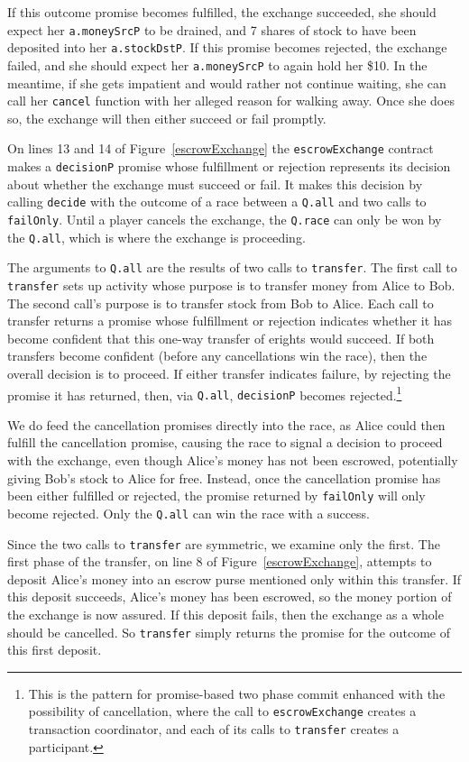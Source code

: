 \documentclass{llncs}
\begin{document}
If this outcome promise becomes fulfilled, the exchange succeeded,  she should expect her {\tt a.moneySrcP} to be drained, and 7 shares of stock to have been deposited into her {\tt a.stockDstP}. If this promise becomes rejected, the exchange failed, and she should expect her {\tt a.moneySrcP} to again hold her \$10. In the meantime, if she gets impatient and would rather not continue waiting, she can call her {\tt cancel} function with her alleged reason for walking away. Once she does so, the exchange will then either succeed or fail promptly.

On lines 13 and 14 of Figure~\ref{escrowExchange} the {\tt escrowExchange} contract makes a {\tt decisionP} promise whose fulfillment or rejection represents its decision about whether the exchange must succeed or fail. It makes this decision by calling {\tt decide} with the outcome of a race between a {\tt Q.all} and two calls to {\tt failOnly}. Until a player cancels the exchange, the {\tt Q.race} can only be won by the {\tt Q.all}, which is where the exchange is proceeding.

The arguments to {\tt Q.all} are the results of two calls to {\tt transfer}. The first call to {\tt transfer} sets up activity whose purpose is to transfer money from Alice to Bob. The second call's purpose is to transfer stock from Bob to Alice. Each call to transfer returns a promise whose fulfillment or rejection indicates whether it has become confident that this one-way transfer of erights would succeed. If both transfers become confident (before any cancellations win the race), then the overall decision is to proceed. If either transfer indicates failure, by rejecting the promise it has returned, then, via {\tt Q.all}, {\tt decisionP} becomes rejected.\footnote{
%
This is the pattern for promise-based two phase commit enhanced with the possibility of cancellation, where the call to {\tt escrowExchange} creates a transaction coordinator, and each of its calls to {\tt transfer} creates a participant.}

We do feed the cancellation promises directly into the race, as Alice could then fulfill the cancellation promise, causing the race to signal a decision to proceed with the exchange, even though Alice's money has not been escrowed, potentially giving Bob's stock to Alice for free. Instead, once the cancellation promise has been either fulfilled or rejected, the promise returned by {\tt failOnly} will only become rejected. Only the {\tt Q.all} can win the race with a success.

Since the two calls to {\tt transfer} are symmetric, we examine only the first. The first phase of the transfer, on line 8 of Figure~\ref{escrowExchange}, attempts to deposit Alice's money into an escrow purse mentioned only within this transfer. If this deposit succeeds, Alice's money has been escrowed, so the money portion of the exchange is now assured. If this deposit fails, then the exchange as a whole should be cancelled. So {\tt transfer} simply returns the promise for the outcome of this first deposit.
\end{document}

